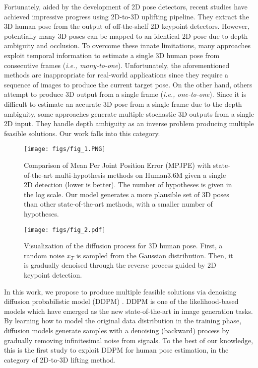\documentclass[letterpaper, 10 pt, conference]{ieeeconf}
\begin{document}
Fortunately, aided by the development of 2D pose detectors, recent studies \cite{Liu_2020_CVPR, chen2020anatomy, wang2020motion} have achieved impressive progress using 2D-to-3D uplifting pipeline.
They extract the 3D human pose from the output of off-the-shelf 2D keypoint detectors.
However, potentially many 3D poses can be mapped to an identical 2D pose due to depth ambiguity and occlusion. To overcome these innate limitations, many approaches \cite{pavllo20193d,zheng20213d,li2022exploiting} exploit temporal information to estimate a single 3D human pose from consecutive frames (\textit{i.e., many-to-one}).
Unfortunately, the aforementioned methods are inappropriate for real-world applications since they require a sequence of images to produce the current target pose.
On the other hand, others \cite{martinez2017simple, zhao2019semantic, wehrbein2021probabilistic} attempt to produce 3D output from a single frame (\textit{i.e., one-to-one}).
Since it is difficult to estimate an accurate 3D pose from a single frame due to the depth ambiguity, some approaches \cite{jahangiri2017generating,sharma2019monocular,li2020weakly,wehrbein2021probabilistic,li2022mhformer} generate multiple stochastic 3D outputs from a single 2D input.
They handle depth ambiguity as an inverse problem producing multiple feasible solutions.
Our work falls into this category.

\begin{figure}[t]
    \centering
    \texttt{[image: figs/fig\_1.PNG]}
    \caption{Comparison of Mean Per Joint Position Error (MPJPE) with state-of-the-art multi-hypothesis methods on Human3.6M given a single 2D detection (lower is better). The number of hypotheses is given in the log scale. Our model generates a more plausible set of 3D poses than other state-of-the-art methods, with a smaller number of hypotheses.}
    \vspace{-20pt}
    \label{fig:1}
\end{figure}
\label{sec:intro}
\begin{figure*}[t]
        \centering
    \texttt{[image: figs/fig\_2.pdf]}
    \caption{Visualization of the diffusion process for 3D human pose. First, a random noise $x_T$ is sampled from the Gaussian distribution. Then, it is gradually denoised through the reverse process guided by 2D keypoint detection.}
    \label{fig:2}
    \vspace{-10pt}
\end{figure*}

In this work, we propose to produce multiple feasible solutions via denoising diffusion probabilistic model (DDPM) \cite{ho2020denoising}.
DDPM is one of the likelihood-based models which have emerged as the new state-of-the-art in image generation tasks.
By learning how to model the original data distribution in the training phase, diffusion models generate samples with a denoising (backward) process by gradually removing infinitesimal noise from signals.
To the best of our knowledge, this is the first study to exploit DDPM for human pose estimation, in the category of 2D-to-3D lifting method.
\end{document}
